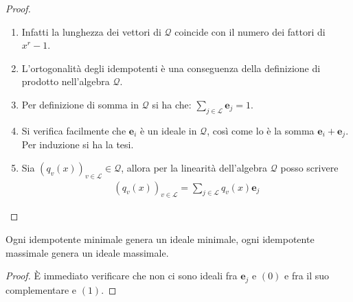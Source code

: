 \begin{proof}
   \begin{enumerate}
      \item Infatti la lunghezza dei vettori di $\mathcal{Q}$ coincide con il numero dei fattori di $x^r-1$.
      \item L'ortogonalità degli idempotenti è una conseguenza della definizione di prodotto nell'algebra $\mathcal{Q}$.
      \item Per definizione di somma in $\mathcal{Q}$ si ha che: $\sum_{j \in \mathscr{L}}\mathbf{e}_{j}  = \mathfrak{1}$.
      \item Si verifica facilmente che $\mathbf{e}_{i} $ è un ideale in $\mathcal{Q}$, così come lo è la somma $\mathbf{e}_{i} + \mathbf{e}_{j}$. Per induzione si ha la tesi.
      \item Sia $(q_{v}(x))_{v \in \mathscr{L}} \in \mathcal{Q}$, allora per la linearità dell'algebra $\mathcal{Q}$ posso scrivere
      \begin{align*}
         (q_{v}(x))_{v \in \mathscr{L}} = \sum_{j \in \mathscr{L}} q_{v}(x) \mathbf{e}_{j}
      \end{align*}
   \end{enumerate}
\end{proof}

\begin{corollario}\label{coroll:idempotentiMinimali}
   Ogni idempotente minimale genera un ideale minimale, ogni idempotente massimale genera un ideale massimale.
\end{corollario}
\begin{proof}
   È immediato verificare che non ci sono ideali fra $\mathbf{e}_{j}$ e $(0)$ e fra il suo complementare e $(1)$.
\end{proof}
